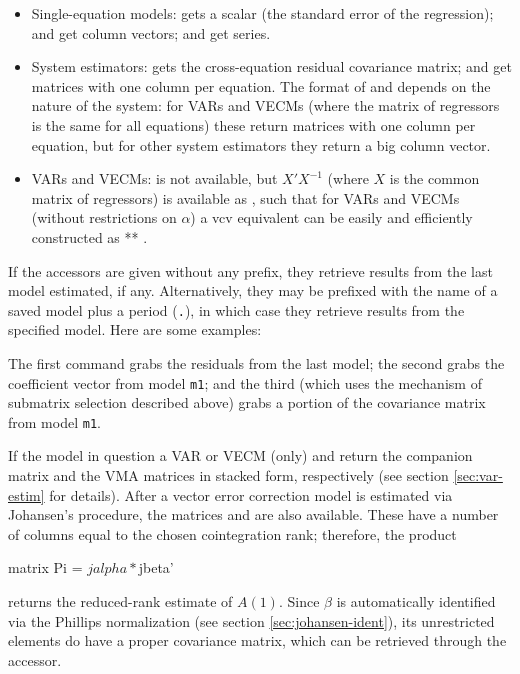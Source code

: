 \begin{itemize}
\item Single-equation models:  gets a scalar (the
  standard error of the regression);  and
   get column vectors;  and
   get series.
\item System estimators:  gets the cross-equation
  residual covariance matrix;  and  get
  matrices with one column per equation.  The format of 
  and  depends on the nature of the system: for VARs
  and VECMs (where the matrix of regressors is the same for all
  equations) these return matrices with one column per equation, but
  for other system estimators they return a big column vector.
\item VARs and VECMs:  is not available, but 
  $X'X^{-1}$ (where $X$ is the common matrix of regressors) is
  available as , 
  such that for VARs and VECMs (without restrictions on $\alpha$) a vcv
  equivalent can be easily and efficiently constructed as 
   ** .
\end{itemize}

If the accessors are given without any prefix, they retrieve results
from the last model estimated, if any.  Alternatively, they may be
prefixed with the name of a saved model plus a period (\texttt{.}), in
which case they retrieve results from the specified model.  Here are
some examples:
%
The first command grabs the residuals from the last model; the second
grabs the coefficient vector from model \texttt{m1}; and the third
(which uses the mechanism of submatrix selection described above)
grabs a portion of the covariance matrix from model \texttt{m1}.

If the model in question a VAR or VECM (only)  and
 return the companion matrix and the VMA matrices in
stacked form, respectively (see section \ref{sec:var-estim} for
details).  After a vector error correction model is estimated via
Johansen's procedure, the matrices  and 
are also available. These have a number of columns equal to the chosen
cointegration rank; therefore, the product
\begin{code}
matrix Pi = $jalpha * $jbeta'
\end{code}
returns the reduced-rank estimate of $A(1)$. Since $\beta$ is
automatically identified via the Phillips normalization (see section
\ref{sec:johansen-ident}), its unrestricted elements do have a proper
covariance matrix, which can be retrieved through the
 accessor.

